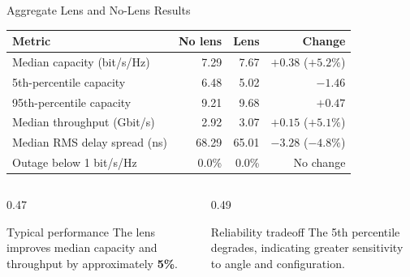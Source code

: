 \begin{frame}[t,shrink=18]{Aggregate Lens and No-Lens Results}
    \centering
    \scriptsize
    \begin{tabular}{lrrr}
        \toprule
        \textbf{Metric} & \textbf{No lens} & \textbf{Lens} &
        \textbf{Change} \\
        \midrule
        Median capacity (bit/s/Hz) & 7.29 & 7.67 &
        $+0.38$ ($+5.2\%$) \\
        5th-percentile capacity & 6.48 & 5.02 & $-1.46$ \\
        95th-percentile capacity & 9.21 & 9.68 & $+0.47$ \\
        Median throughput (Gbit/s) & 2.92 & 3.07 &
        $+0.15$ ($+5.1\%$) \\
        Median RMS delay spread (ns) & 68.29 & 65.01 &
        $-3.28$ ($-4.8\%$) \\
        Outage below 1 bit/s/Hz & 0.0\% & 0.0\% & No change \\
        \bottomrule
    \end{tabular}

    \vspace{4mm}
    \begin{columns}[T,onlytextwidth]
        \begin{column}{0.47\textwidth}
            \begin{exampleblock}{Typical performance}
                The lens improves median capacity and throughput by
                approximately \textbf{5\%}.
            \end{exampleblock}
        \end{column}
        \begin{column}{0.49\textwidth}
            \begin{alertblock}{Reliability tradeoff}
                The 5th percentile degrades, indicating greater sensitivity
                to angle and configuration.
            \end{alertblock}
        \end{column}
    \end{columns}
\end{frame}

